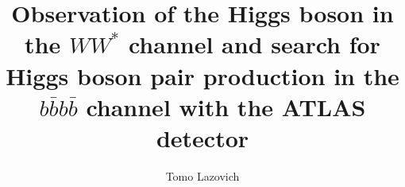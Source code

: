 \title{
Observation of the Higgs boson in the $WW^*$ channel and search for Higgs boson pair production in the $b\bar{b}b\bar{b}$ channel with the ATLAS detector}
\author{Tomo Lazovich}



